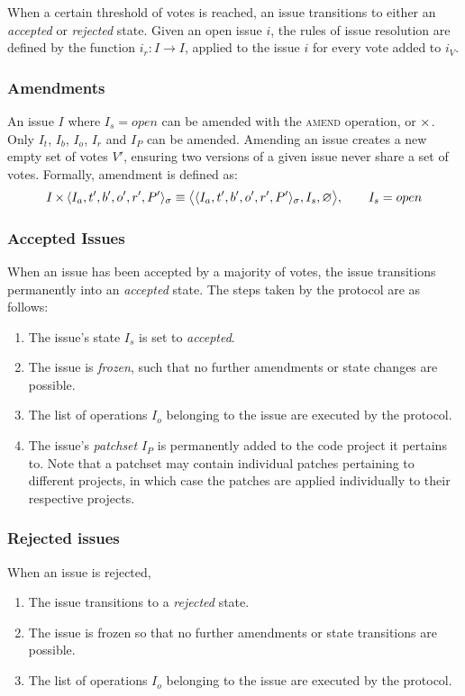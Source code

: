 When a certain threshold of votes is reached, an issue transitions to either an
\emph{accepted} or \emph{rejected} state. Given an open issue $i$, the rules of
issue resolution are defined by the function $i_r : I \to I$, applied to the
issue $i$ for every vote added to $i_V$.

\subsubsection{Amendments}

An issue $I$ where $I_s = open$ can be amended with the \textsc{amend}
operation, or $\operatorname{\times}$. Only $I_t$, $I_b$, $I_o$, $I_r$ and $I_P$ can be
amended.  Amending an issue creates a new empty set of votes $V'$, ensuring two
versions of a given issue never share a set of votes. Formally, amendment is
defined as:
\begin{align*}
    I \operatorname{\times}{} \langle I_a, t', b', o', r', P' \rangle_{\sigma} \equiv
    \big<\langle I_a, t', b', o', r', P' \rangle_{\sigma}, I_s, \varnothing
    \big>, \qquad I_s = open
\end{align*}


\subsubsection{Accepted Issues} When an issue has been accepted by a majority
of votes, the issue transitions permanently into an \emph{accepted} state. The
steps taken by the protocol are as follows:

\begin{enumerate}
    \item The issue's state $I_s$ is set to \emph{accepted}.
    \item The issue is \emph{frozen}, such that no further amendments or state
        changes are possible.
    \item The list of operations $I_o$ belonging to the issue are executed by
        the protocol.
    \item The issue's \emph{patchset} $I_P$ is permanently added to the code
        project it pertains to. Note that a patchset may contain individual
        patches pertaining to different projects, in which case the patches are
        applied individually to their respective projects.
\end{enumerate}

\subsubsection{Rejected issues} When an issue is rejected,
\begin{enumerate}
    \item The issue transitions to a \emph{rejected} state.
    \item The issue is frozen so that no further amendments or state
        transitions are possible.
    \item The list of operations $I_o$ belonging to the issue are executed by
        the protocol.
\end{enumerate}

